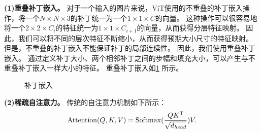 %

\textbf{(1)重叠补丁嵌入。}
对于一个输入的图片来说，ViT使用的不重叠的补丁嵌入操作，将一个$N \times N \times 3$的补丁统一为一个$1 \times 1 \times C$的向量。
这种操作可以很容易地将一个$2 \times 2 \times C_i$的特征统一为$1 \times 1 \times C_{i+1}$的向量，从而获得分层特征映射。
因此，我们可以将不同的层次特征不断缩小，从而获得预期大小尺寸的特征映射。
但是，不重叠的补丁嵌入不能保证补丁的局部连续性。
因此，我们使用重叠补丁嵌入。
通过定义补丁大小、两个相邻补丁之间的步幅和填充大小，可以产生与不重叠补丁嵌入一样大小的特征。
重叠补丁嵌入如\ref{图：补丁嵌入} 所示。
\begin{figure}[h]
	\centering%
	\vspace{-1em}
	\caption{补丁嵌入}
	\label{图：补丁嵌入}
\end{figure}



\textbf{(2)稀疏自注意力。}
传统的自注意力机制如下所示：
\begin{equation}
	{\rm Attention}({Q}, {K}, {V}) = {\rm Softmax}(\frac{{Q}{K}^\mathsf{T}}{\sqrt{d_{head}}}){V}.
	\label{eqn:mhsa}
\end{equation}

